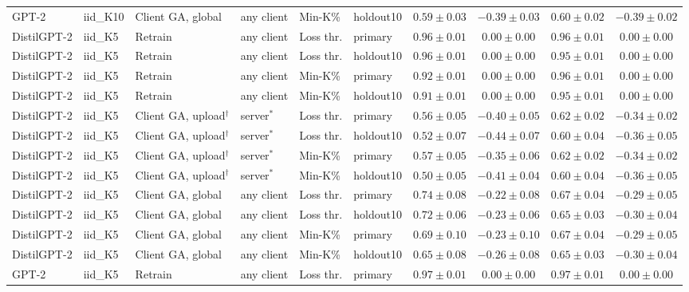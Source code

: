 \begin{table}[t]
\begin{tabular*}{\textwidth}{@{\extracolsep{\fill}}llllllcccc@{}}
GPT-2 & iid\_K10 & Client GA, global & any client & Min-K\% & holdout10 & $0.59 \pm 0.03$ & $-0.39 \pm 0.03$ & $0.60 \pm 0.02$ & $-0.39 \pm 0.02$ \\
DistilGPT-2 & iid\_K5 & Retrain & any client & Loss thr. & primary & $0.96 \pm 0.01$ & $0.00 \pm 0.00$ & $0.96 \pm 0.01$ & $0.00 \pm 0.00$ \\
DistilGPT-2 & iid\_K5 & Retrain & any client & Loss thr. & holdout10 & $0.96 \pm 0.01$ & $0.00 \pm 0.00$ & $0.95 \pm 0.01$ & $0.00 \pm 0.00$ \\
DistilGPT-2 & iid\_K5 & Retrain & any client & Min-K\% & primary & $0.92 \pm 0.01$ & $0.00 \pm 0.00$ & $0.96 \pm 0.01$ & $0.00 \pm 0.00$ \\
DistilGPT-2 & iid\_K5 & Retrain & any client & Min-K\% & holdout10 & $0.91 \pm 0.01$ & $0.00 \pm 0.00$ & $0.95 \pm 0.01$ & $0.00 \pm 0.00$ \\
DistilGPT-2 & iid\_K5 & Client GA, upload$^{\dagger}$ & server$^{*}$ & Loss thr. & primary & $0.56 \pm 0.05$ & $-0.40 \pm 0.05$ & $0.62 \pm 0.02$ & $-0.34 \pm 0.02$ \\
DistilGPT-2 & iid\_K5 & Client GA, upload$^{\dagger}$ & server$^{*}$ & Loss thr. & holdout10 & $0.52 \pm 0.07$ & $-0.44 \pm 0.07$ & $0.60 \pm 0.04$ & $-0.36 \pm 0.05$ \\
DistilGPT-2 & iid\_K5 & Client GA, upload$^{\dagger}$ & server$^{*}$ & Min-K\% & primary & $0.57 \pm 0.05$ & $-0.35 \pm 0.06$ & $0.62 \pm 0.02$ & $-0.34 \pm 0.02$ \\
DistilGPT-2 & iid\_K5 & Client GA, upload$^{\dagger}$ & server$^{*}$ & Min-K\% & holdout10 & $0.50 \pm 0.05$ & $-0.41 \pm 0.04$ & $0.60 \pm 0.04$ & $-0.36 \pm 0.05$ \\
DistilGPT-2 & iid\_K5 & Client GA, global & any client & Loss thr. & primary & $0.74 \pm 0.08$ & $-0.22 \pm 0.08$ & $0.67 \pm 0.04$ & $-0.29 \pm 0.05$ \\
DistilGPT-2 & iid\_K5 & Client GA, global & any client & Loss thr. & holdout10 & $0.72 \pm 0.06$ & $-0.23 \pm 0.06$ & $0.65 \pm 0.03$ & $-0.30 \pm 0.04$ \\
DistilGPT-2 & iid\_K5 & Client GA, global & any client & Min-K\% & primary & $0.69 \pm 0.10$ & $-0.23 \pm 0.10$ & $0.67 \pm 0.04$ & $-0.29 \pm 0.05$ \\
DistilGPT-2 & iid\_K5 & Client GA, global & any client & Min-K\% & holdout10 & $0.65 \pm 0.08$ & $-0.26 \pm 0.08$ & $0.65 \pm 0.03$ & $-0.30 \pm 0.04$ \\
GPT-2 & iid\_K5 & Retrain & any client & Loss thr. & primary & $0.97 \pm 0.01$ & $0.00 \pm 0.00$ & $0.97 \pm 0.01$ & $0.00 \pm 0.00$ \\

\end{tabular*}
\end{table}
